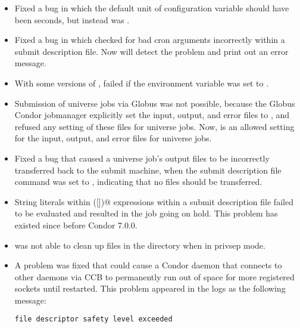 \begin{itemize}
\item Fixed a bug in which the default unit of configuration variable
should have been seconds, but instead was .

\item Fixed a bug in which  checked for bad  cron 
 arguments incorrectly within a submit description file.
 Now  will detect the problem and print out an error message.

\item With some versions of ,  failed if
the  environment variable was set to .

\item Submission of  universe jobs via Globus was not possible,
because the Globus Condor jobmanager explicitly set the input, output,
and error files to ,
and  refused any setting of these files for
 universe jobs.  
Now,  is an allowed setting for the input, output,
and error files for  universe jobs.

\item Fixed a bug that caused a  universe job's output files
to be incorrectly transferred back to the submit machine, 
when the submit description file command 
was set to ,
indicating that no files should be transferred.

\item String literals within \verb@$$([])@ expressions within a submit
description file failed to be evaluated and resulted in the job going on hold.
This problem has existed since before Condor 7.0.0.

\item {} was not able to clean up files in the 
directory when in privsep mode.

\item A problem was fixed that could cause a Condor daemon that
  connects to other daemons via CCB to permanently run out of space
  for more registered sockets until restarted.  This problem appeared
  in the logs as the following message:

\begin{verbatim}
file descriptor safety level exceeded
\end{verbatim}


\end{itemize}
